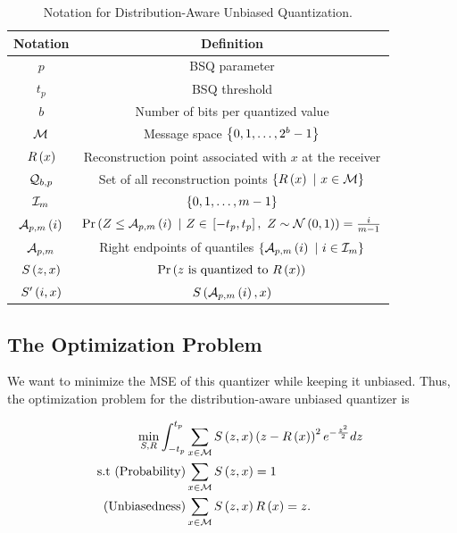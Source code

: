 \documentclass[journal,12pt,twocolumn]{IEEEtran}
\begin{document}
\begin{table}
    \centering
    \begin{tabular}{|c|c|}
        \hline
        \textbf{Notation} & \textbf{Definition} \\
        \hline
        \(p\) & BSQ parameter \\
        \hline
        \(t_p\) & BSQ threshold \\
        \hline
        \(b\) & Number of bits per quantized value \\
        \hline
        \(\mathcal M\) & Message space \(\left\{0,1,\ldots,2^b-1\right\}\) \\
        \hline
        \(R\left(x\right)\) & Reconstruction point associated with \(x\) at the receiver \\
        \hline
        \(\mathcal Q_{b,p}\) & Set of all reconstruction points \(\left\{R\left(x\right)\ |\ x \in \mathcal M\right\}\) \\
        \hline
        \(\mathcal I_m\) & \(\left\{0,1,\ldots,m-1\right\}\) \\
        \hline
        \(\mathcal A_{p,m}\left(i\right)\) & \(\Pr\left(Z \le \mathcal A_{p,m}\left(i\right)\ |\ Z \in {}\left[-t_p,t_p\right],\ Z \sim \mathcal N\left(0,1\right)\right) = \frac{i}{m-1}\) \\
        \hline
        \(\mathcal A_{p,m}\) & Right endpoints of quantiles \(\cbrak{\cA_{p,m}\brak{i}\ |\ i\in\cI_m}\) \\
        \hline
        \(S\left(z,x\right)\) & \(\Pr\left(z \text{ is quantized to } R\left(x\right)\right)\) \\
        \hline
        \(S^\prime\left(i,x\right)\) & \(S\left(\mathcal A_{p,m}\left(i\right), x\right)\) \\
        \hline
    \end{tabular}
    \caption{Notation for Distribution-Aware Unbiased Quantization.}
    \label{tab:dauq-defs}
\end{table}

\subsection{The Optimization Problem}
\label{ssec:dauq-opt}
We want to minimize the MSE of this quantizer while keeping it unbiased. Thus,
the optimization problem for the distribution-aware unbiased quantizer is

\begin{align}
    \min_{S,R} \int_{-t_p}^{t_p} &\sum_{x\in\cM}S\brak{z,x}\brak{z-R\brak{x}}^2e^{-\frac{z^2}{2}}dz\ \label{eq:dauq-mse} \\
    \text{s.t (Probability)} &\sum_{x\in\cM}S\brak{z,x} = 1 \label{eq:dauq-prob} \\
    \text{(Unbiasedness)} &\sum_{x\in\cM}S\brak{z,x}R\brak{x} = z. \label{eq:dauq-unbias}
\end{align}
\end{document}
